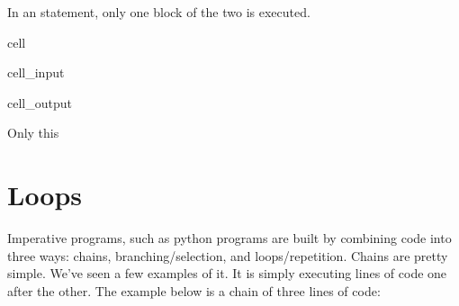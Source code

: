\documentclass[letterpaper,10pt,english]{jupyterBook}
\begin{document}
\sphinxAtStartPar
In an  statement, only one block of the two is executed.

\begin{sphinxuseclass}{cell}\begin{sphinxVerbatimInput}

\begin{sphinxuseclass}{cell_input}
\begin{sphinxVerbatim}[commandchars=\\\{\}]
 
\end{sphinxVerbatim}

\end{sphinxuseclass}\end{sphinxVerbatimInput}
\begin{sphinxVerbatimOutput}

\begin{sphinxuseclass}{cell_output}
\begin{sphinxVerbatim}[commandchars=\\\{\}]
Only this
\end{sphinxVerbatim}

\end{sphinxuseclass}\end{sphinxVerbatimOutput}

\end{sphinxuseclass}
\sphinxstepscope


\chapter{Loops}
\label{\detokenize{loops:loops}}\label{\detokenize{loops::doc}}
\sphinxAtStartPar
Imperative programs, such as python programs are built by combining code into three ways: chains, branching/selection, and loops/repetition. Chains are pretty simple. We’ve seen a few examples of it. It is simply executing lines of code one after the other. The example below is a chain of three lines of code:
\end{document}
